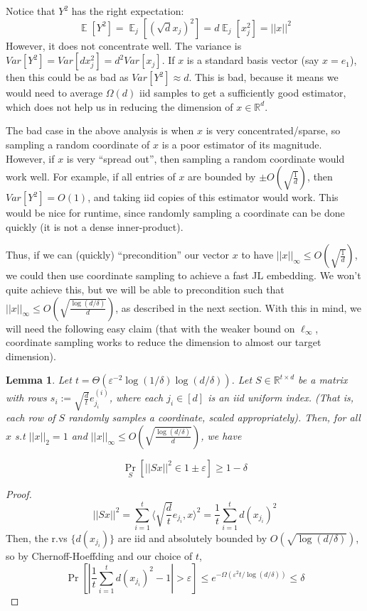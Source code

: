 \documentclass[]{article}
\newtheorem{lemma}{Lemma}
\newcommand{\1}{\mathbb{1}}
\newcommand{\x}{\times}
\newcommand{\R}{\mathbb{R}}
\newcommand{\E}{\mathop{\mathbb{E}}}
\renewcommand{\epsilon}{\varepsilon}
\newcommand{\innp}[1]{\langle #1 \rangle}
\begin{document}
Notice that $Y^2$ has the right expectation:
$$\E[Y^2] = \E_j[(\sqrt{d} x_j)^2] = d \E_j[x_j^2] = ||x||^2$$
However, it does not concentrate well. The variance is
$Var[Y^2] = Var[d x_j^2] = d^2 Var[x_j]$.
If $x$ is a standard basis vector (say $x = e_1$),
then this could be as bad as $Var[Y^2] \approx d$.
This is bad, because it means we would need to average $\Omega(d)$ iid samples to get a
sufficiently good estimator, which does not help us in reducing the dimension of
$x \in \R^d$.

The bad case in the above analysis is when $x$ is very
concentrated/sparse, so sampling a random coordinate of $x$ is a poor
estimator of its magnitude.
However, if $x$ is very ``spread out'', then sampling a
random coordinate would work well.
For example, if all entries of $x$ are bounded by $\pm O(\sqrt{\frac{1}{d}})$,
then $Var[Y^2] = O(1)$, and taking iid copies of this estimator would work.
This would be nice for runtime, since randomly sampling a coordinate can be done quickly (it
is not a dense inner-product).

Thus, if we can (quickly) ``precondition'' our vector $x$ to have
$||x||_{\infty} \leq O(\sqrt{\frac{1}{d}})$, we could then use coordinate
sampling to achieve a fast JL embedding.
We won't quite achieve this, but we will be able to precondition such that
$||x||_\infty \leq O(\sqrt{\frac{\log(d/\delta)}{d}})$, as described in the next
section.
With this in mind, we will need the following easy claim (that with the weaker
bound on $\ell_\infty$, coordinate sampling works to reduce the dimension
to almost our target dimension).

\begin{lemma}
    \label{lem:S}
    Let $t = \Theta(\epsilon^{-2}\log(1/\delta)\log(d/\delta))$.
    Let $S \in \R^{t \x d}$ be a matrix
    with rows $s_i := \sqrt{\frac{d}{t}} e^{(i)}_{j_i}$,
    where each $j_i \in [d]$ is an iid uniform index.
    (That is, each row of $S$ randomly samples a coordinate, scaled
    appropriately).
    Then, for all $x$ s.t $||x||_2=1$ and $||x||_\infty \leq O(\sqrt{\frac{\log(d/\delta)}{d}})$,
    we have

    $$\Pr_{S}[ ||Sx||^2 \in 1 \pm \epsilon] \geq 1-\delta$$
\end{lemma}
\begin{proof}
$$||Sx||^2
= \sum_{i=1}^t \innp{\sqrt{\frac{d}{t}} e_{j_i}, x}^2
= \frac{1}{t}\sum_{i=1}^t d (x_{j_i})^2$$
Then, the r.vs $\{d (x_{j_i})\}$ are iid and absolutely bounded by
$O(\sqrt{\log(d/\delta)})$, so by Chernoff-Hoeffding and our choice of $t$,
$$\Pr[ |\frac{1}{t}\sum_{i=1}^t d (x_{j_i})^2 - 1| > \epsilon]
\leq e^{-\Omega(\epsilon^2 t / \log(d/\delta))} \leq \delta$$
\end{proof}
\end{document}
